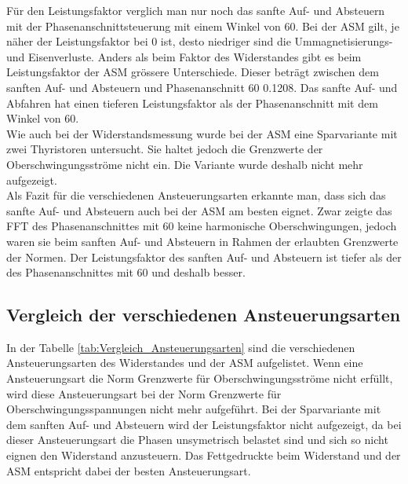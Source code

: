 Für den Leistungsfaktor verglich man nur noch das sanfte Auf- und Absteuern mit der Phasenanschnittsteuerung mit einem Winkel von 60\textdegree \hspace{0.02cm}. Bei der ASM gilt, je näher der Leistungsfaktor bei 0 ist, desto niedriger sind die Ummagnetisierungs- und Eisenverluste. Anders als beim Faktor des Widerstandes gibt es beim Leistungsfaktor der ASM grössere Unterschiede. Dieser beträgt zwischen dem sanften Auf- und Absteuern und Phasenanschnitt 60\textdegree \hspace{0.02cm} 0.1208. Das sanfte Auf- und Abfahren hat einen tieferen Leistungsfaktor als der Phasenanschnitt mit dem Winkel von 60\textdegree. \\

Wie auch bei der Widerstandsmessung wurde bei der ASM eine Sparvariante mit zwei Thyristoren untersucht. Sie haltet jedoch die Grenzwerte der Oberschwingungsströme nicht ein. Die Variante wurde deshalb nicht mehr aufgezeigt.\\

Als Fazit für die verschiedenen Ansteuerungsarten erkannte man, dass sich das sanfte Auf- und Absteuern auch bei der ASM am besten eignet. Zwar zeigte das FFT des Phasenanschnittes mit 60\textdegree \hspace{0.02cm} keine harmonische Oberschwingungen, jedoch waren sie beim sanften Auf- und Absteuern in Rahmen der erlaubten Grenzwerte der Normen. Der Leistungsfaktor des sanften Auf- und Absteuern ist tiefer als der des Phasenanschnittes mit 60\textdegree \hspace{0.02cm} und deshalb besser.


\newpage
\subsection{Vergleich der verschiedenen Ansteuerungsarten}
In der Tabelle \ref{tab:Vergleich_Ansteuerungsarten} sind die verschiedenen Ansteuerungsarten des Widerstandes und der ASM aufgelistet. Wenn eine Ansteuerungsart die Norm Grenzwerte für Oberschwingungsströme nicht erfüllt, wird diese Ansteuerungsart bei der Norm Grenzwerte für Oberschwingungsspannungen nicht mehr aufgeführt. Bei der Sparvariante mit dem sanften Auf- und Absteuern wird der Leistungsfaktor nicht aufgezeigt, da bei dieser Ansteuerungsart die Phasen unsymetrisch belastet sind und sich so nicht eignen den Widerstand anzusteuern.
Das Fettgedruckte beim Widerstand und der ASM entspricht dabei der besten Ansteuerungsart. 

